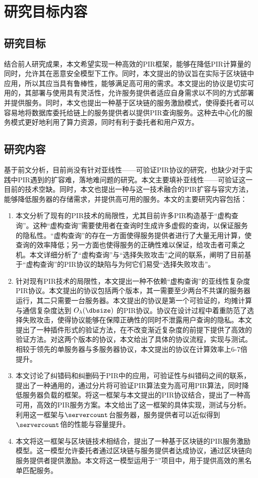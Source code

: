\section{研究目标内容}

\subsection{研究目标}
结合前人研究成果，本文希望实现一种高效的PIR框架，能够在降低PIR计算量的同时，允许其在恶意安全模型下工作。同时，本文提出的协议旨在实际于区块链中应用，所以其应当具有鲁棒性，能够满足高可用的需求。本文提出的协议是切实可用的，其部署与使用具有灵活性，允许服务提供者适应自身需求以不同的方式部署并提供服务。同时，本文也提出一种基于区块链的服务激励模式，使得委托者可以容易地将数据库委托给链上的服务提供者以提供PIR查询服务。这种去中心化的服务模式更好地利用了算力资源，同时有利于委托者和用户双方。

\subsection{研究内容}

基于前文分析，目前尚没有针对亚线性——可验证PIR协议的研究，也缺少对于实践中PIR遇到的扩容难，落地难问题的研究。本文主要填补亚线性——可验证这一目前的技术空缺。同时，本文也提出一种与这一技术融合的PIR扩容与容灾方法，能够降低服务器的存储需求，并提供高可用的服务。本文的主要研究内容包括：
\begin{enumerate}
    \item 本文分析了现有的PIR技术的局限性，尤其目前许多PIR构造基于“虚构查询”。这种“虚构查询”需要使用者在查询时生成许多虚假的查询，以保证服务的隐私性。“虚构查询”的存在一方面使得服务提供者进行了大量无用计算，使查询的效率降低；另一方面也使得服务的正确性难以保证，给攻击者可乘之机。本文详细分析了“虚构查询”与“选择失败攻击”之间的联系，阐明了目前基于“虚构查询”的PIR协议的缺陷与为何它们易受“选择失败攻击”。
    \item 针对现有PIR技术的局限性，本文提出一种不依赖“虚构查询”的亚线性复杂度PIR协议。本文提出的协议包括两个版本，其一需要至少两台不共谋的服务器运行，其二只需要一台服务器。本文提出的协议是第一个可验证的，均摊计算与通信复杂度达到 $O_\lambda(\dbsize)$ 的PIR协议。协议在设计过程中着重防范了选择失败攻击，使得协议能够在保障正确性的同时不泄露用户查询的隐私。本文提出了一种插件形式的验证方法，在不改变渐近复杂度的前提下提供了高效的验证方法。对这两个版本的协议，本文给出了具体的协议流程，实现与测试。相较于领先的单服务器与多服务器协议，本文提出的协议在计算效率上6-7倍提升。
    \item 本文讨论了纠错码和纠删码于PIR中的应用，可验证性与纠错码之间的联系，提出了一种通用的，通过分片将可验证PIR算法变为高可用PIR算法，同时降低服务器负载的框架。将这一框架与本文提出的PIR协议结合，提出了一种高可用，高效的PIR服务方案。本文给出了这一框架的具体实现，测试与分析。利用这一框架与$\servercount$台服务器，服务提供者可以近似得到$\servercount$倍的性能与容量提升。
    \item 本文将这一框架与区块链技术相结合，提出了一种基于区块链的PIR服务激励模型。这一模型允许委托者通过区块链与服务提供者达成协议，通过区块链向服务提供者提供激励。本文将这一模型运用于“\projectname”项目中，用于提供高效的黑名单匹配服务。
\end{enumerate}
